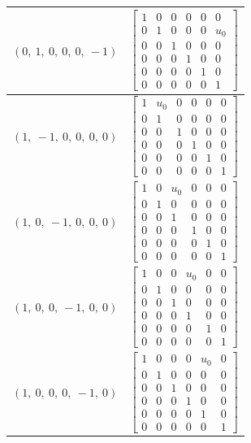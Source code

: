 \documentclass[11pt]{article}
\theoremstyle{definition}
\begin{document}
\begin{longtable}{|l|c|}
    \hline
    $\left( 0, \  1, \  0, \  0, \  0, \  -1\right)$ & ${\left[\begin{matrix}1 & 0 & 0 & 0 & 0 & 0\\0 & 1 & 0 & 0 & 0 & u_{0}\\0 & 0 & 1 & 0 & 0 & 0\\0 & 0 & 0 & 1 & 0 & 0\\0 & 0 & 0 & 0 & 1 & 0\\0 & 0 & 0 & 0 & 0 & 1\end{matrix}\right]}$ \\
    \hline
    $\left( 1, \  -1, \  0, \  0, \  0, \  0\right)$ & ${\left[\begin{matrix}1 & u_{0} & 0 & 0 & 0 & 0\\0 & 1 & 0 & 0 & 0 & 0\\0 & 0 & 1 & 0 & 0 & 0\\0 & 0 & 0 & 1 & 0 & 0\\0 & 0 & 0 & 0 & 1 & 0\\0 & 0 & 0 & 0 & 0 & 1\end{matrix}\right]}$ \\
    \hline
    $\left( 1, \  0, \  -1, \  0, \  0, \  0\right)$ & ${\left[\begin{matrix}1 & 0 & u_{0} & 0 & 0 & 0\\0 & 1 & 0 & 0 & 0 & 0\\0 & 0 & 1 & 0 & 0 & 0\\0 & 0 & 0 & 1 & 0 & 0\\0 & 0 & 0 & 0 & 1 & 0\\0 & 0 & 0 & 0 & 0 & 1\end{matrix}\right]}$ \\
    \hline
    $\left( 1, \  0, \  0, \  -1, \  0, \  0\right)$ & ${\left[\begin{matrix}1 & 0 & 0 & u_{0} & 0 & 0\\0 & 1 & 0 & 0 & 0 & 0\\0 & 0 & 1 & 0 & 0 & 0\\0 & 0 & 0 & 1 & 0 & 0\\0 & 0 & 0 & 0 & 1 & 0\\0 & 0 & 0 & 0 & 0 & 1\end{matrix}\right]}$ \\
    \hline
    $\left( 1, \  0, \  0, \  0, \  -1, \  0\right)$ & ${\left[\begin{matrix}1 & 0 & 0 & 0 & u_{0} & 0\\0 & 1 & 0 & 0 & 0 & 0\\0 & 0 & 1 & 0 & 0 & 0\\0 & 0 & 0 & 1 & 0 & 0\\0 & 0 & 0 & 0 & 1 & 0\\0 & 0 & 0 & 0 & 0 & 1\end{matrix}\right]}$ \\

\end{longtable}
\end{document}
